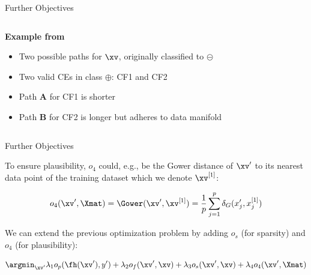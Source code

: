 \documentclass[11pt,compress,t,notes=noshow, aspectratio=169, xcolor=table, usenames,dvipsnames]{beamer}
\begin{document}
\begin{frame}{Further Objectives}
{\begin{columns}[c]
\begin{column}{0.6\textwidth}
\textbf{Example from } 
\begin{itemize}
    \item Two possible paths for \textcolor{blue}{$\xv$},			originally classified to $\pmb{\circleddash}$
    \item Two valid CEs in class $\pmb\oplus$: {\color{Red} CF1} and {\color{Green} CF2}
    \item {\color{Red} Path \textbf{A} for CF1} is shorter
    \item {\color{Green} Path \textbf{B} for CF2} is longer but adheres to data manifold
\end{itemize}
\end{column}
\end{columns}
}

\end{frame}


\begin{frame}{Further Objectives}

To ensure plausibility, $o_4$ could, e.g., be the Gower distance of $\xv'$ to its nearest data point of the training dataset which we denote $\xv^{[1]}$:
	
$$o_4(\xv', \Xmat) = \Gower(\xv', \xv^{[1]}) = \frac{1}{p} \sum_{j = 1}^{p}  \delta_G(x_j', x^{[1]}_j)$$

We can extend the previous optimization problem by adding $o_s$ (for sparsity) and $o_4$ (for plausibility):

$$\argmin_{\xv'} \lambda_1 o_p(\fh(\xv'), y') + \lambda_2 o_f(\xv', \xv) + \lambda_3 o_s(\xv', \xv) + \lambda_4 o_4(\xv', \Xmat)$$

\end{frame}
\end{document}
